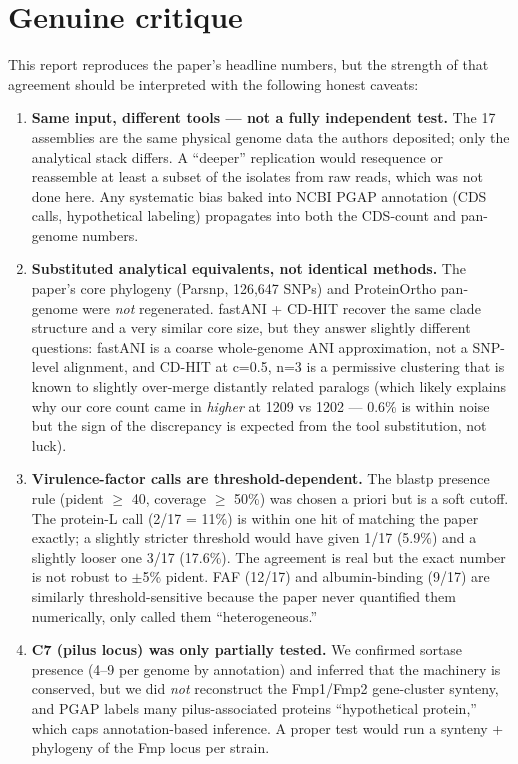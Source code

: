 \documentclass[11pt]{article}
\begin{document}
\section{Genuine critique}
This report reproduces the paper's headline numbers, but the strength of that agreement should be interpreted with the following honest caveats:

\begin{enumerate}
\item \textbf{Same input, different tools --- not a fully independent test.} The 17 assemblies are the same physical genome data the authors deposited; only the analytical stack differs. A ``deeper'' replication would resequence or reassemble at least a subset of the isolates from raw reads, which was not done here. Any systematic bias baked into NCBI PGAP annotation (CDS calls, hypothetical labeling) propagates into both the CDS-count and pan-genome numbers.
\item \textbf{Substituted analytical equivalents, not identical methods.} The paper's core phylogeny (Parsnp, 126{,}647 SNPs) and ProteinOrtho pan-genome were \emph{not} regenerated. fastANI + CD-HIT recover the same clade structure and a very similar core size, but they answer slightly different questions: fastANI is a coarse whole-genome ANI approximation, not a SNP-level alignment, and CD-HIT at c=0.5, n=3 is a permissive clustering that is known to slightly over-merge distantly related paralogs (which likely explains why our core count came in \emph{higher} at 1209 vs 1202 --- 0.6\% is within noise but the sign of the discrepancy is expected from the tool substitution, not luck).
\item \textbf{Virulence-factor calls are threshold-dependent.} The blastp presence rule (pident $\geq$ 40, coverage $\geq$ 50\%) was chosen a priori but is a soft cutoff. The protein-L call (2/17 = 11\%) is within one hit of matching the paper exactly; a slightly stricter threshold would have given 1/17 (5.9\%) and a slightly looser one 3/17 (17.6\%). The agreement is real but the exact number is not robust to $\pm$5\% pident. FAF (12/17) and albumin-binding (9/17) are similarly threshold-sensitive because the paper never quantified them numerically, only called them ``heterogeneous.''
\item \textbf{C7 (pilus locus) was only partially tested.} We confirmed sortase presence (4--9 per genome by annotation) and inferred that the machinery is conserved, but we did \emph{not} reconstruct the Fmp1/Fmp2 gene-cluster synteny, and PGAP labels many pilus-associated proteins ``hypothetical protein,'' which caps annotation-based inference. A proper test would run a synteny + phylogeny of the Fmp locus per strain.

\end{enumerate}
\end{document}
